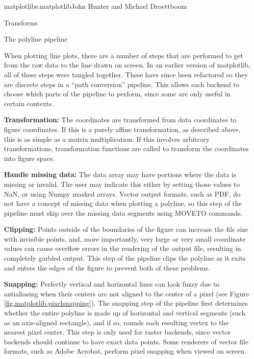 \begin{aosachapter}{matplotlib}{s:matplotlib}{John Hunter and Michael Droettboom}
\begin{aosasect1}{Transforms}

\end{aosasect1}

\begin{aosasect1}{The polyline pipeline}

When plotting line plots, there are a number of steps that are
performed to get from the raw data to the line drawn on screen.  In an
earlier version of matplotlib, all of these steps were tangled
together.  These have since been refactored so they are discrete steps
in a ``path conversion'' pipeline.  This allows each backend to choose
which parts of the pipeline to perform, since some are only useful
in certain contexts.

\begin{aosaenumerate}

\item \textbf{Transformation:} The coordinates are transformed from data
  coordinates to figure coordinates.  If this is a purely affine
  transformation, as described above, this is as simple as a matrix
  multiplication.  If this involves arbitrary transformations,
  transformation functions are called to transform the coordinates
  into figure space.

\item \textbf{Handle missing data:} The data array may have portions
  where the data is missing or invalid.  The user may indicate this
  either by setting those values to NaN, or using Numpy masked arrays.
  Vector output formats, such as PDF, do not have a concept of missing
  data when plotting a polyline, so this step of the pipeline must
  skip over the missing data segments using MOVETO commands.

\item \textbf{Clipping:} Points outside of the boundaries of the
  figure can increase the file size with invisible points, and, more
  importantly, very large or very small coordinate values can cause
  overflow errors in the rendering of the output file, resulting in
  completely garbled output.  This step of the pipeline clips the
  polyline as it exits and enters the edges of the figure to prevent
  both of these problems.

\item \textbf{Snapping:} Perfectly vertical and horizontal lines can
  look fuzzy due to antialiasing when their centers are not aligned to
  the center of a pixel (see Figure
  \ref{fig.matplotlib.pixelsnapping}).  The snapping step of the
  pipeline first determines whether the entire polyline is made up of
  horizontal and vertical segments (such as an axis-aligned
  rectangle), and if so, rounds each resulting vertex to the nearest
  pixel center.  This step is only used for raster backends, since
  vector backends should continue to have exact data points.  Some
  renderers of vector file formats, such as Adobe Acrobat, perform
  pixel snapping when viewed on screen.


\end{aosaenumerate}
\end{aosasect1}
\end{aosachapter}
